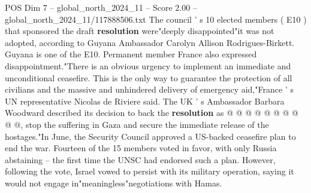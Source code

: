 \begin{textsample}{POS Dim 7 – global\_north\_2024\_11 – Score 2.00 – global\_north\_2024\_11/117888506.txt}
The council ' s 10 elected members ( E10 ) that sponsored the draft \textbf{resolution} were"deeply disappointed"it was not adopted, according to Guyana Ambassador Carolyn Allison Rodrigues-Birkett.
Guyana is one of the E10.
Permanent member France also expressed disappointment."There is an obvious urgency to implement an immediate and unconditional ceasefire.
This is the only way to guarantee the protection of all civilians and the massive and unhindered delivery of emergency aid,"France ' s UN representative Nicolas de Riviere said.
The UK ' s Ambassador Barbara Woodward described its decision to back the \textbf{resolution} as @ @ @ @ @ @ @ @ @ @, stop the suffering in Gaza and secure the immediate release of the hostages."In June, the Security Council approved a US-backed ceasefire plan to end the war.
Fourteen of the 15 members voted in favor, with only Russia abstaining -- the first time the UNSC had endorsed such a plan.
However, following the vote, Israel vowed to persist with its military operation, saying it would not engage in"meaningless"negotiations with Hamas.

\end{textsample}

